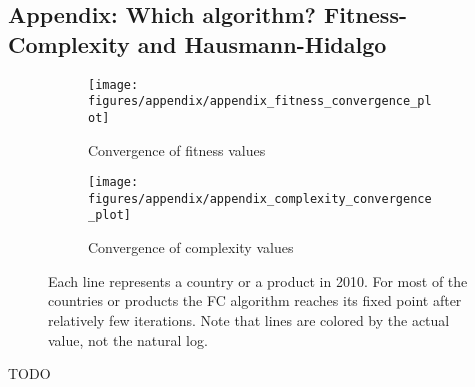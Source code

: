 \documentclass[11pt]{article}
\begin{document}
\begin{appendices}


\newpage

\section{Appendix: Which algorithm? Fitness-Complexity and Hausmann-Hidalgo}
\label{sec:appendix-algorithm}

\begin{figure}
     \centering
     \begin{subfigure}[b]{0.45\textwidth}
         \centering
         \texttt{[image: figures/appendix/appendix\_fitness\_convergence\_plot]}
	 \caption{Convergence of fitness values}
         \label{fig:fit_conv}
     \end{subfigure}
     \hfill
     \begin{subfigure}[b]{0.45\textwidth}
         \centering
         \texttt{[image: figures/appendix/appendix\_complexity\_convergence\_plot]}
         \caption{Convergence of complexity values}
         \label{fig:comp_conv}
     \end{subfigure}
     \caption{Each line represents a country or a product in 2010. For most of the countries or products the FC algorithm reaches its fixed point after relatively few iterations. Note that lines are colored by the actual value, not the natural log.}
        \label{fig:fc_conv}
\end{figure}


TODO
\end{appendices}

\newpage
\end{document}

